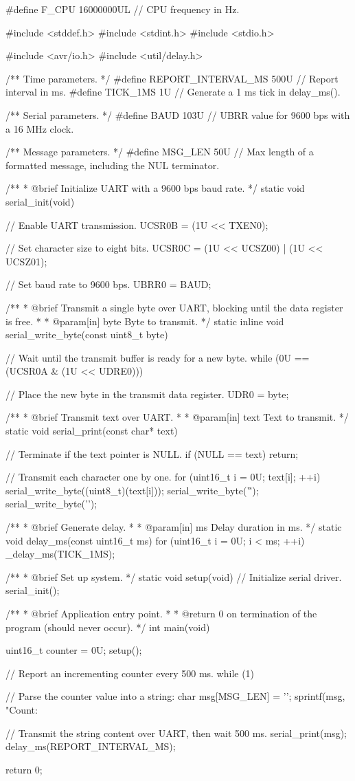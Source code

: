 \begin{ccode}
#define F_CPU 16000000UL // CPU frequency in Hz.

#include <stddef.h>
#include <stdint.h>
#include <stdio.h>

#include <avr/io.h>
#include <util/delay.h>

/** Time parameters. */
#define REPORT_INTERVAL_MS 500U // Report interval in ms.
#define TICK_1MS 1U             // Generate a 1 ms tick in delay_ms().

/** Serial parameters. */
#define BAUD 103U // UBRR value for 9600 bps with a 16 MHz clock.

/** Message parameters. */
#define MSG_LEN 50U // Max length of a formatted message, including the NUL terminator.

/**
 * @brief Initialize UART with a 9600 bps baud rate.
 */
static void serial_init(void)
{
    // Enable UART transmission.
    UCSR0B = (1U << TXEN0);

    // Set character size to eight bits.
    UCSR0C = (1U << UCSZ00) | (1U << UCSZ01);

    // Set baud rate to 9600 bps.
    UBRR0 = BAUD;
}

/**
 * @brief Transmit a single byte over UART, blocking until the data register is free.
 *
 * @param[in] byte Byte to transmit.
 */
static inline void serial_write_byte(const uint8_t byte)
{
    // Wait until the transmit buffer is ready for a new byte.
    while (0U == (UCSR0A & (1U << UDRE0))) {}

    // Place the new byte in the transmit data register.
    UDR0 = byte;
}

/**
 * @brief Transmit text over UART.
 *
 * @param[in] text Text to transmit.
 */
static void serial_print(const char* text)
{
    // Terminate if the text pointer is NULL.
    if (NULL == text) { return; }

    // Transmit each character one by one.
    for (uint16_t i = 0U; text[i]; ++i)
    {
        serial_write_byte((uint8_t)(text[i]));
    }
    serial_write_byte('\r');
    serial_write_byte('\n');
}

/**
 * @brief Generate delay.
 *
 * @param[in] ms Delay duration in ms.
 */
static void delay_ms(const uint16_t ms)
{
    for (uint16_t i = 0U; i < ms; ++i)
    {
        _delay_ms(TICK_1MS);
    }
}

/**
 * @brief Set up system.
 */
static void setup(void)
{
    // Initialize serial driver.
    serial_init();
}

/**
 * @brief Application entry point.
 *
 * @return 0 on termination of the program (should never occur).
 */
int main(void)
{
    uint16_t counter = 0U;
    setup();

    // Report an incrementing counter every 500 ms.
    while (1)
    {
        // Parse the counter value into a string:
        char msg[MSG_LEN] = {'\0'};
        sprintf(msg, "Count: %

        // Transmit the string content over UART, then wait 500 ms.
        serial_print(msg);
        delay_ms(REPORT_INTERVAL_MS);
    }
    return 0;
}
\end{ccode}

